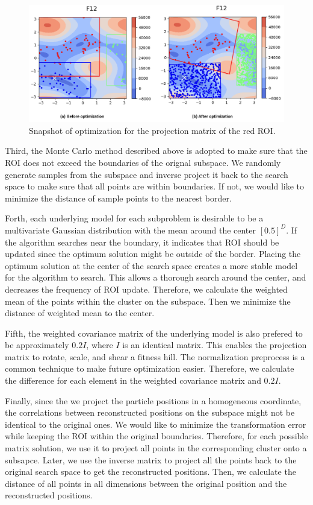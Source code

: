 \begin{figure}
\centering
\includegraphics[width=\textwidth]{Sample_projection}
\caption{Snapshot of optimization for the projection matrix of the red ROI.}\label{fig:Sample_projection}
\end{figure}

Third, the Monte Carlo method described above is adopted to make sure that the ROI does not exceed the boundaries of the orignal subspace.
We randomly generate samples from the subspace and inverse project it back to the search space to make sure that all points are within boundaries.
If not, we would like to minimize the distance of sample points to the nearest border.

Forth, each underlying model for each subproblem is desirable 
to be a multivariate Gaussian distribution with the mean around the center $[0.5]^D$.
If the algorithm searches near the boundary, it indicates that ROI should be updated since the optimum solution might be outside of the border.
Placing the optimum solution at the center of the search space creates a more stable model for the algorithm to search.
This allows a thorough search around the center, and decreases the frequency of ROI update.
Therefore, we calculate the weighted mean of the points within the cluster on the subspace.
Then we minimize the distance of weighted mean to the center.  

Fifth, the weighted covariance matrix of the underlying model is also prefered to be approximately $0.2I$, where $I$ is an identical matrix.
This enables the projection matrix to rotate, scale, and shear a fitness hill.
The normalization preprocess is a common technique to make future optimization easier.
Therefore, we calculate the difference for each element in the weighted covariance matrix and $0.2I$.  

Finally, since the we project the particle positions in a homogeneous coordinate,
the correlations between reconstructed positions on the subspace might not be identical to the original ones.
We would like to minimize the transformation error while keeping the ROI within the original boundaries.
Therefore, for each possible matrix solution, we use it to project all points in the corresponding cluster onto a subsapce.
Later, we use the inverse matrix to project all the points back to the original search space to get the reconstructed positions.
Then, we calculate the distance of all points in all dimensions between the original position and the reconstructed positions.


